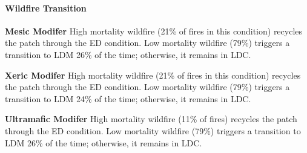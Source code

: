 \paragraph{Wildfire Transition}
\begin{adjustwidth}{2cm}{}
\textbf{Mesic Modifer } High mortality wildfire (21\% of fires in this condition) recycles the patch through the ED condition. Low mortality wildfire (79\%) triggers a transition to LDM 26\% of the time; otherwise, it remains in LDC.

\medskip
\noindent \textbf{Xeric Modifer} High mortality wildfire (21\% of fires in this condition) recycles the patch through the ED condition. Low mortality wildfire (79\%) triggers a transition to LDM 24\% of the time; otherwise, it remains in LDC.

\medskip
\noindent \textbf{Ultramafic Modifer} High mortality wildfire (11\% of fires) recycles the patch through the ED condition. Low mortality wildfire (79\%) triggers a transition to LDM 26\% of the time; otherwise, it remains in LDC.

\end{adjustwidth}
\noindent\hrulefill

